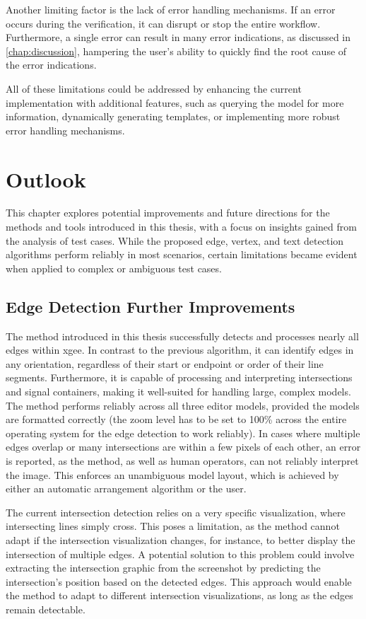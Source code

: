 Another limiting factor is the lack of error handling mechanisms. If an error occurs during the verification, it can disrupt or stop the entire workflow. Furthermore, a single error can result in many error indications, as discussed in \autoref{chap:discussion}, hampering the user's ability to quickly find the root cause of the error indications.

All of these limitations could be addressed by enhancing the current implementation with additional features, such as querying the model for more information, dynamically generating templates, or implementing more robust error handling mechanisms.\\


\chapter{Outlook}
\label{chap:outlook}
This chapter explores potential improvements and future directions for the methods and tools introduced in this thesis, with a focus on insights gained from the analysis of test cases. While the proposed edge, vertex, and text detection algorithms perform reliably in most scenarios, certain limitations became evident when applied to complex or ambiguous test cases.

\section{Edge Detection Further Improvements}
\label{sec:edge_detection_further_improvements}
The method introduced in this thesis successfully detects and processes nearly all edges within \acrshort{xgee}. In contrast to the previous algorithm, it can identify edges in any orientation, regardless of their start or endpoint or order of their line segments. Furthermore, it is capable of processing and interpreting intersections and signal containers, making it well-suited for handling large, complex models. The method performs reliably across all three editor models, provided the models are formatted correctly (the zoom level has to be set to 100\% across the entire operating system for the edge detection to work reliably). In cases where multiple edges overlap or many intersections are within a few pixels of each other, an error is reported, as the method, as well as human operators, can not reliably interpret the image. This enforces an unambiguous model layout, which is achieved by either an automatic arrangement algorithm or the user.

The current intersection detection relies on a very specific visualization, where intersecting lines simply cross. This poses a limitation, as the method cannot adapt if the intersection visualization changes, for instance, to better display the intersection of multiple edges. A potential solution to this problem could involve extracting the intersection graphic from the screenshot by predicting the intersection's position based on the detected edges. This approach would enable the method to adapt to different intersection visualizations, as long as the edges remain detectable.

